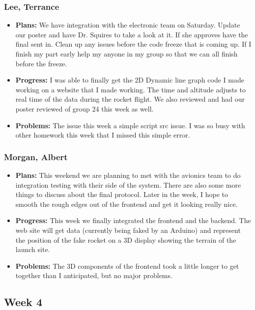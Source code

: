 \documentclass[10pt,draftclsnofoot,onecolumn]{IEEEtran}
\begin{document}
\subsubsection{Lee, Terrance}
\begin{itemize}
	\item \textbf{Plans: }
	We have integration with the electronic team on Saturday. Update our poster and have Dr. Squires to take a look at it. If she approves have the final sent in. Clean up any issues before the code freeze that is coming up. If I finish my part early help my anyone in my group so that we can all finish before the freeze.
	\item \textbf{Progress:  }
	I was able to finally get the 2D Dynamic line graph code I made working on a website that I made working. The time and altitude adjusts to real time of the data during the rocket flight. We also reviewed and had our poster reviewed of group 24 this week as well.
	\item \textbf{Problems: }
	The issue this week a simple script src issue. I was so busy with other homework this week that I missed this simple error.
\end{itemize}


\subsubsection{Morgan, Albert}
\begin{itemize}
	\item \textbf{Plans: }
	This weekend we are planning to met with the avionics team to do integration testing with their side of the system. There are also some more things to discuss about the final protocol. Later in the week, I hope to smooth the rough edges out of the frontend and get it looking really nice.
	\item \textbf{Progress: }
	This week we finally integrated the frontend and the backend. The web site will get data (currently being faked by an Arduino) and represent the position of the fake rocket on a 3D display showing the terrain of the launch site.
	\item \textbf{Problems: }
	The 3D components of the frontend took a little longer to get together than I anticipated, but no major problems.
\end{itemize}

\subsection{Week 4}
\end{document}

